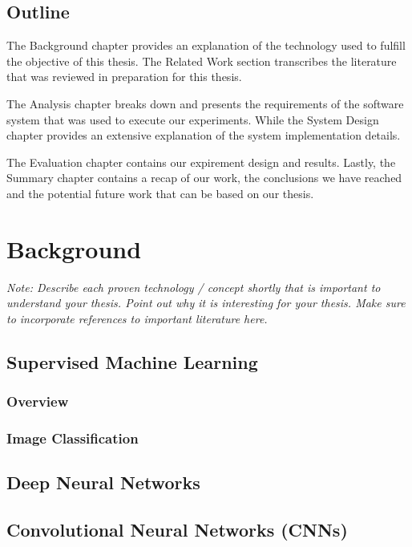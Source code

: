 \documentclass[a4paper,12pt,twoside]{report}
\begin{document}
\section{Outline}

The Background chapter provides an explanation of the technology used to fulfill the objective of this thesis. The Related Work section transcribes the literature that was reviewed in preparation for this thesis.

The Analysis chapter breaks down and presents the requirements of the software system that was used to execute our experiments. While the System Design chapter provides an extensive explanation of the system implementation details.

The Evaluation chapter contains our expirement design and results. Lastly, the Summary chapter contains a recap of our work, the conclusions we have reached and the potential future work that can be based on our thesis.











\chapter{Background}

\textit{Note: Describe each proven technology / concept shortly that is important to understand your thesis. Point out why it is interesting for your thesis. Make sure to incorporate references to important literature here.}

\section{Supervised Machine Learning}
\subsection{Overview}
\subsection{Image Classification}

\section{Deep Neural Networks}

\section{Convolutional Neural Networks (CNNs)}
\end{document}
